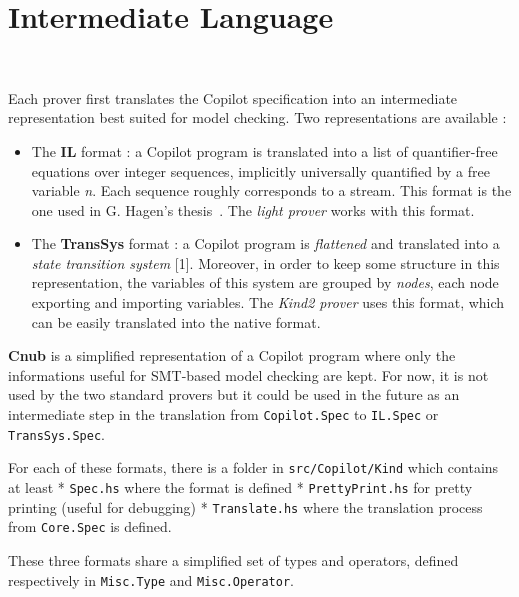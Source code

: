 \section{Intermediate Language}~\label{sec:il}




Each prover first translates the Copilot specification into an
intermediate representation best suited for model checking. Two
representations are available :

\begin{itemize}
\item
  The \textbf{IL} format : a Copilot program is translated into a list
  of quantifier-free equations over integer sequences, implicitly
  universally quantified by a free variable \emph{n}. Each sequence
  roughly corresponds to a stream. This format is the one used in G.
  Hagen's thesis~\cite{HagenPhD}. The \emph{light prover} works with this
  format.
\item
  The \textbf{TransSys} format : a Copilot program is \emph{flattened}
  and translated into a \emph{state transition system} {[}1{]}.
  Moreover, in order to keep some structure in this representation, the
  variables of this system are grouped by \emph{nodes}, each node
  exporting and importing variables. The \emph{Kind2 prover} uses this
  format, which can be easily translated into the native format.
\end{itemize}

\textbf{Cnub} is a simplified representation of a Copilot program where
only the informations useful for SMT-based model checking are kept. For
now, it is not used by the two standard provers but it could be used in
the future as an intermediate step in the translation from
\texttt{Copilot.Spec} to \texttt{IL.Spec} or \texttt{TransSys.Spec}.

For each of these formats, there is a folder in
\texttt{src/Copilot/Kind} which contains at least * \texttt{Spec.hs}
where the format is defined * \texttt{PrettyPrint.hs} for pretty
printing (useful for debugging) * \texttt{Translate.hs} where the
translation process from \texttt{Core.Spec} is defined. 

These three formats share a simplified set of types and operators,
defined respectively in \texttt{Misc.Type} and \texttt{Misc.Operator}.




